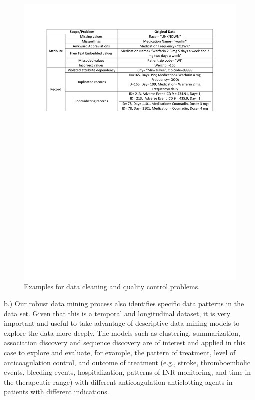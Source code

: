\documentclass{article}
\begin{document}
\begin{figure}[ht]
\begin{center}
\includegraphics[trim=20mm 165mm 10mm 20mm, clip]{dataQCproblems.pdf}
\caption{Examples for data cleaning and quality control problems.}
\end{center}
\end{figure}

b.) Our robust data mining process also identifies specific data patterns in the data set. Given that this is a temporal and longitudinal dataset, it is very important and useful to take advantage of descriptive data mining models to explore the data more deeply. The models such as clustering, summarization, association discovery and sequence discovery are of interest and applied in this case to explore and evaluate, for example, the pattern of treatment, level of anticoagulation control, and outcome of treatment (e.g., stroke, thromboembolic events, bleeding events, hospitalization, patterns of INR monitoring, and time in the therapeutic range) with different anticoagulation anticlotting agents in patients with different indications.
\end{document}

